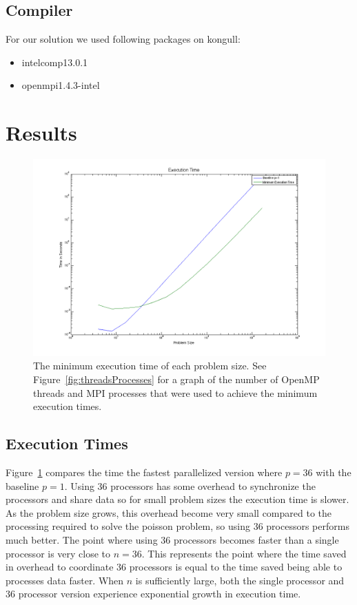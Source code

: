 \documentclass{article}
\begin{document}
\subsection{Compiler}

For our solution we used following packages on kongull:
\begin{itemize}
\item intelcomp13.0.1
\item openmpi1.4.3-intel
\end{itemize}
\section{Results}

	\begin{figure}[htbp]
	\begin{center}
	\includegraphics[width=15cm,keepaspectratio=true]{figs/executionTime}
	\caption{The minimum execution time of each problem size. See Figure~\ref{fig:threadsProcesses} for a graph of the number of OpenMP threads and MPI processes that were used to achieve the minimum execution times.}
	\label{fig:executionTime}
	\end{center}
	\end{figure}

\subsection{Execution Times}

	Figure~\ref{fig:executionTime} compares the time the fastest parallelized version where $p=36$ with the baseline $p=1$. Using 36 processors has some overhead to synchronize the processors and share data so for small problem sizes the execution time is slower. As the problem size grows, this overhead become very small compared to the processing required to solve the poisson problem, so using 36 processors performs much better. The point where using 36 processors becomes faster than a single processor is very close to $n=36$. This represents the point where the time saved in overhead to coordinate 36 processors is equal to the time saved being able to processes data faster. When $n$ is sufficiently large, both the single processor and 36 processor version experience exponential growth in execution time.  
\end{document}
